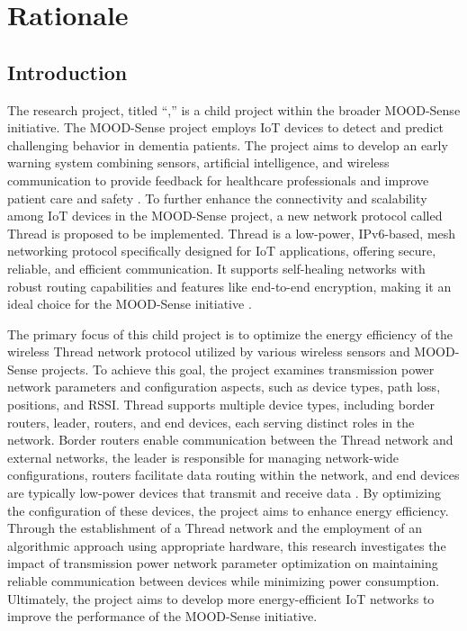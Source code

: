 \chapter{Rationale}\label{chap:rationale}

\section{Introduction}

The research project, titled ``\makeatletter\@title\makeatother,'' is a child project within the broader MOOD-Sense initiative. The MOOD-Sense project employs \gls{IoT} devices to detect and predict challenging behavior in dementia patients. The project aims to develop an early warning system combining sensors, artificial intelligence, and wireless communication to provide feedback for healthcare professionals and improve patient care and safety \cite{MOOD-Sense_Research}. To further enhance the connectivity and scalability among \gls{IoT} devices in the MOOD-Sense project, a new network protocol called Thread is proposed to be implemented. Thread is a low-power, IPv6-based, mesh networking protocol specifically designed for \gls{IoT} applications, offering secure, reliable, and efficient communication. It supports self-healing networks with robust routing capabilities and features like end-to-end encryption, making it an ideal choice for the MOOD-Sense initiative \cite{Thread_Group_Benefits}.

The primary focus of this child project is to optimize the energy efficiency of the wireless Thread network protocol utilized by various wireless sensors and MOOD-Sense projects. To achieve this goal, the project examines transmission power network parameters and configuration aspects, such as device types, path loss, positions, and \gls{RSSI}. Thread supports multiple device types, including border routers, leader, routers, and end devices, each serving distinct roles in the network. Border routers enable communication between the Thread network and external networks, the leader is responsible for managing network-wide configurations, routers facilitate data routing within the network, and end devices are typically low-power devices that transmit and receive data \cite{Thread_Group_Fundamentals}. By optimizing the configuration of these devices, the project aims to enhance energy efficiency. Through the establishment of a Thread network and the employment of an algorithmic approach using appropriate hardware, this research investigates the impact of transmission power network parameter optimization on maintaining reliable communication between devices while minimizing power consumption. Ultimately, the project aims to develop more energy-efficient \gls{IoT} networks to improve the performance of the MOOD-Sense initiative.


